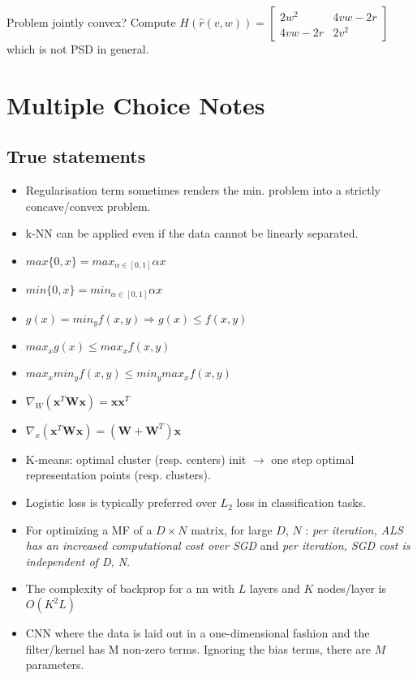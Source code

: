 Problem jointly convex? Compute $H(\hat{r}({v,w})) = \begin{bmatrix} 2w^2 & 4vw-2r \\ 4vw-2r & 2v^2 \end{bmatrix}$ which is not PSD in general.


\section{Multiple Choice Notes}
\subsection{True statements}
\begin{itemize}
\item Regularisation term sometimes renders the min. problem into a strictly concave/convex problem.
\item k-NN can be applied even if the data cannot be linearly separated.
\item $max\{ 0, x\} = max_{\alpha \in [0,1]} \alpha x$
\item $min\{ 0, x\} = min_{\alpha \in [0,1]} \alpha x$
\item $g(x) = min_y f(x,y) \Rightarrow g(x) \le f(x,y)$
\item $max_x g(x) \le max_x f(x,y)$
\item $max_x min_y f(x,y) \le min_y max_x f(x,y)$
\item $\nabla_{W} (\mathbf{x}^T\mathbf{W}\mathbf{x}) = \mathbf{x}\mathbf{x}^T$
\item $\nabla_{x} (\mathbf{x}^T\mathbf{W}\mathbf{x}) = (\mathbf{W}+\mathbf{W}^T)\mathbf{x}$
\item K-means: optimal cluster (resp. centers) init $\rightarrow$ one step optimal representation points (resp. clusters).
\item Logistic loss is typically preferred over $L_2$ loss in classification tasks.
\item For optimizing a MF of a $D\times N$ matrix, for large $D$, $N$ : \textit{per iteration, ALS has an increased computational cost over SGD} and \textit{per iteration, SGD cost is independent of D, N}.
\item The complexity of backprop for a nn with $L$ layers and $K$ nodes/layer is $O(K^2L)$
\item CNN where the data is laid out in a one-dimensional fashion and the filter/kernel has M non-zero terms. Ignoring the bias terms, there are $M$ parameters.
\end{itemize}

